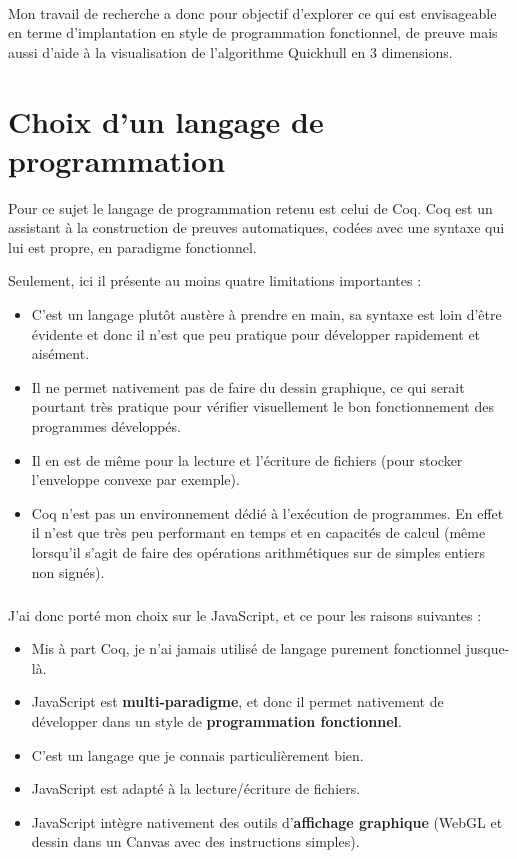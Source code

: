 \documentclass[]{article}
\begin{document}
\paragraph{}
Mon travail de recherche a donc pour objectif d'explorer ce qui est envisageable en terme d'implantation en style de programmation fonctionnel, de preuve mais aussi d'aide à la visualisation de l'algorithme Quickhull en 3 dimensions.

\section{Choix d'un langage de programmation}
Pour ce sujet le langage de programmation retenu est celui de Coq. Coq est un assistant à la construction de preuves automatiques, codées avec une syntaxe qui lui est propre, en paradigme fonctionnel.

Seulement, ici il présente au moins quatre limitations importantes :
\begin{itemize}
	\item C'est un langage plutôt austère à prendre en main, sa syntaxe est loin d'être évidente et donc il n'est que peu pratique pour développer rapidement et aisément.
	\item Il ne permet nativement pas de faire du dessin graphique, ce qui serait pourtant très pratique pour vérifier visuellement le bon fonctionnement des programmes développés.
	\item Il en est de même pour la lecture et l'écriture de fichiers (pour stocker l'enveloppe convexe par exemple).
	\item Coq n'est pas un environnement dédié à l'exécution de programmes. En effet il n'est que très peu performant en temps et en capacités de calcul (même lorsqu'il s'agit de faire des opérations arithmétiques sur de simples entiers non signés).
\end{itemize}

\subparagraph{}
J'ai donc porté mon choix sur le JavaScript, et ce pour les raisons suivantes :
\begin{itemize}
	\item Mis à part Coq, je n'ai jamais utilisé de langage purement fonctionnel jusque-là.
	\item JavaScript est \textbf{multi-paradigme}, et donc il permet nativement de développer dans un style de \textbf{programmation fonctionnel}.
	\item C'est un langage que je connais particulièrement bien.
	\item JavaScript est adapté à la lecture/écriture de fichiers.
	\item JavaScript intègre nativement des outils d'\textbf{affichage graphique} (WebGL et dessin dans un Canvas avec des instructions simples).
\end{itemize}
\end{document}

